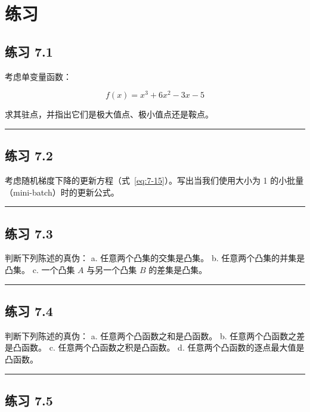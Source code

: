 \chapter*{练习}

\section*{练习 7.1}

考虑单变量函数：

\begin{equation*}
f(x) = x^3 + 6x^2 - 3x - 5
\end{equation*}

求其驻点，并指出它们是极大值点、极小值点还是鞍点。

\medskip\hrule\medskip

\section*{练习 7.2}

考虑随机梯度下降的更新方程（式~\eqref{eq:7-15}）。写出当我们使用大小为 1 的小批量（mini-batch）时的更新公式。

\medskip\hrule\medskip

\section*{练习 7.3}

判断下列陈述的真伪： a. 任意两个凸集的交集是凸集。 b. 任意两个凸集的并集是凸集。 c. 一个凸集 $ A $ 与另一个凸集 $ B $ 的差集是凸集。

\medskip\hrule\medskip

\section*{练习 7.4}

判断下列陈述的真伪： a. 任意两个凸函数之和是凸函数。 b. 任意两个凸函数之差是凸函数。 c. 任意两个凸函数之积是凸函数。 d. 任意两个凸函数的逐点最大值是凸函数。

\medskip\hrule\medskip

\section*{练习 7.5}

